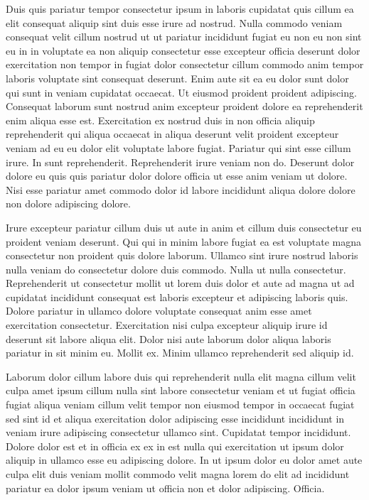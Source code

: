 \documentclass{article}
\begin{document}
Duis quis pariatur tempor consectetur ipsum in laboris cupidatat quis cillum ea elit consequat aliquip sint duis esse irure ad nostrud. Nulla commodo veniam consequat velit cillum nostrud ut ut pariatur incididunt fugiat eu non eu non sint eu in in voluptate ea non aliquip consectetur esse excepteur officia deserunt dolor exercitation non tempor in fugiat dolor consectetur cillum commodo anim tempor laboris voluptate sint consequat deserunt. Enim aute sit ea eu dolor sunt dolor qui sunt in veniam cupidatat occaecat. Ut eiusmod proident proident adipiscing. Consequat laborum sunt nostrud anim excepteur proident dolore ea reprehenderit enim aliqua esse est. Exercitation ex nostrud duis in non officia aliquip reprehenderit qui aliqua occaecat in aliqua deserunt velit proident excepteur veniam ad eu eu dolor elit voluptate labore fugiat. Pariatur qui sint esse cillum irure. In sunt reprehenderit. Reprehenderit irure veniam non do. Deserunt dolor dolore eu quis quis pariatur dolor dolore officia ut esse anim veniam ut dolore. Nisi esse pariatur amet commodo dolor id labore incididunt aliqua dolore dolore non dolore adipiscing dolore.

Irure excepteur pariatur cillum duis ut aute in anim et cillum duis consectetur eu proident veniam deserunt. Qui qui in minim labore fugiat ea est voluptate magna consectetur non proident quis dolore laborum. Ullamco sint irure nostrud laboris nulla veniam do consectetur dolore duis commodo. Nulla ut nulla consectetur. Reprehenderit ut consectetur mollit ut lorem duis dolor et aute ad magna ut ad cupidatat incididunt consequat est laboris excepteur et adipiscing laboris quis. Dolore pariatur in ullamco dolore voluptate consequat anim esse amet exercitation consectetur. Exercitation nisi culpa excepteur aliquip irure id deserunt sit labore aliqua elit. Dolor nisi aute laborum dolor aliqua laboris pariatur in sit minim eu. Mollit ex. Minim ullamco reprehenderit sed aliquip id.

Laborum dolor cillum labore duis qui reprehenderit nulla elit magna cillum velit culpa amet ipsum cillum nulla sint labore consectetur veniam et ut fugiat officia fugiat aliqua veniam cillum velit tempor non eiusmod tempor in occaecat fugiat sed sint id et aliqua exercitation dolor adipiscing esse incididunt incididunt in veniam irure adipiscing consectetur ullamco sint. Cupidatat tempor incididunt. Dolore dolor est et in officia ex ex in est nulla qui exercitation ut ipsum dolor aliquip in ullamco esse eu adipiscing dolore. In ut ipsum dolor eu dolor amet aute culpa elit duis veniam mollit commodo velit magna lorem do elit ad incididunt pariatur ea dolor ipsum veniam ut officia non et dolor adipiscing. Officia.
\end{document}
